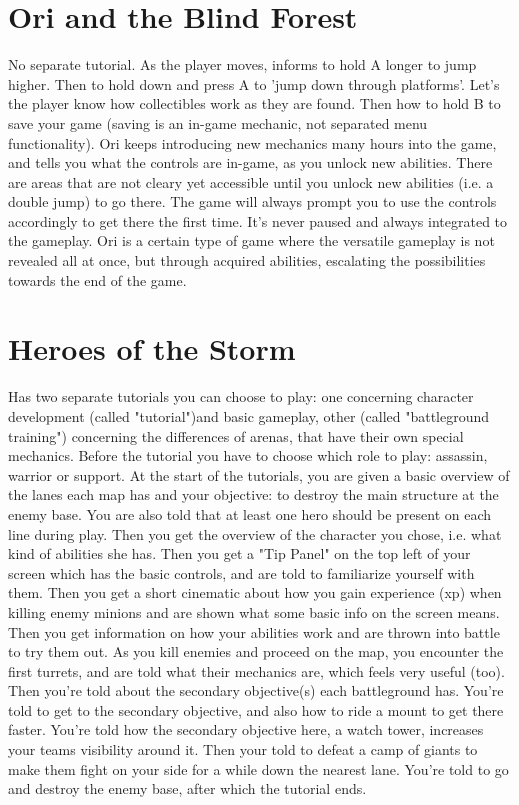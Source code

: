 \section{Ori and the Blind Forest}

No separate tutorial.
As the player moves, informs to hold A longer to jump higher.
Then to hold down and press A to 'jump down through platforms'.
Let's the player know how collectibles work as they are found.
Then how to hold B to save your game (saving is an in-game mechanic, not separated menu functionality).
Ori keeps introducing new mechanics many hours into the game, and tells you what the controls are in-game, as you unlock new abilities.
There are areas that are not cleary yet accessible until you unlock new abilities (i.e. a double jump) to go there. The game will always prompt you to use the controls accordingly to get there the first time. It's never paused and always integrated to the gameplay.
Ori is a certain type of game where the versatile gameplay is not revealed all at once, but through acquired abilities, escalating the possibilities towards the end of the game.

\section{Heroes of the Storm}

Has two separate tutorials you can choose to play: one concerning character development (called "tutorial")and basic gameplay, other (called "battleground training") concerning the differences of arenas, that have their own special mechanics.
Before the tutorial you have to choose which role to play: assassin, warrior or support.
At the start of the tutorials, you are given a basic overview of the lanes each map has and your objective: to destroy the main structure at the enemy base. You are also told that at least one hero should be present on each line during play.
Then you get the overview of the character you chose, i.e. what kind of abilities she has.
Then you get a "Tip Panel" on the top left of your screen which has the basic controls, and are told to familiarize yourself with them.
Then you get a short cinematic about how you gain experience (xp) when killing enemy minions and are shown what some basic info on the screen means.
Then you get information on how your abilities work and are thrown into battle to try them out.
As you kill enemies and proceed on the map, you encounter the first turrets, and are told what their mechanics are, which feels very useful (too).
Then you're told about the secondary objective(s) each battleground has.
You're told to get to the secondary objective, and also how to ride a mount to get there faster.
You're told how the secondary objective here, a watch tower, increases your teams visibility around it.
Then your told to defeat a camp of giants to make them fight on your side for a while down the nearest lane.
You're told to go and destroy the enemy base, after which the tutorial ends.

